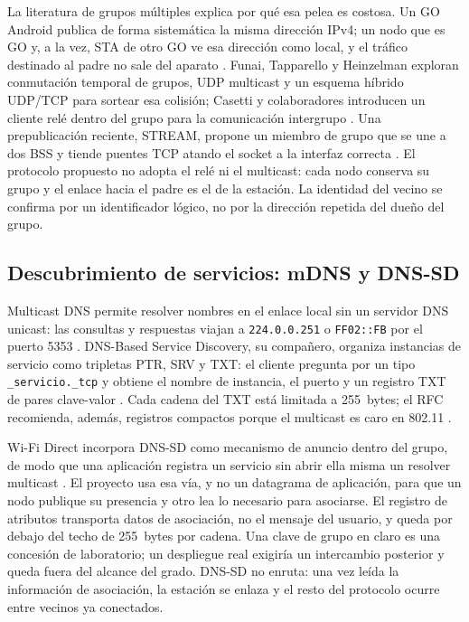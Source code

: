 \documentclass[12pt,oneside]{scrreprt}
\begin{document}
La literatura de grupos múltiples explica por qué esa pelea es costosa. Un GO Android publica de forma sistemática la misma dirección IPv4; un nodo que es GO y, a la vez, STA de otro GO ve esa dirección como local, y el tráfico destinado al padre no sale del aparato \parencite{Funai2017,Casetti2015}. Funai, Tapparello y Heinzelman exploran conmutación temporal de grupos, UDP multicast y un esquema híbrido UDP/TCP para sortear esa colisión; Casetti y colaboradores introducen un cliente relé dentro del grupo para la comunicación intergrupo \parencite{Funai2017,Casetti2015}. Una prepublicación reciente, STREAM, propone un miembro de grupo que se une a dos BSS y tiende puentes TCP atando el socket a la interfaz correcta \parencite{Dao2024}. El protocolo propuesto no adopta el relé ni el multicast: cada nodo conserva su grupo y el enlace hacia el padre es el de la estación. La identidad del vecino se confirma por un identificador lógico, no por la dirección repetida del dueño del grupo.

\subsection{Descubrimiento de servicios: mDNS y DNS-SD}
\label{sec:dns-sd}

Multicast DNS permite resolver nombres en el enlace local sin un servidor DNS unicast: las consultas y respuestas viajan a \texttt{224.0.0.251} o \texttt{FF02::FB} por el puerto 5353 \parencite{Cheshire2013mDNS}. DNS-Based Service Discovery, su compañero, organiza instancias de servicio como tripletas PTR, SRV y TXT: el cliente pregunta por un tipo \texttt{\_servicio.\_tcp} y obtiene el nombre de instancia, el puerto y un registro TXT de pares clave-valor \parencite{Cheshire2013DNSSD}. Cada cadena del TXT está limitada a 255~bytes; el RFC recomienda, además, registros compactos porque el multicast es caro en 802.11 \parencite{Cheshire2013DNSSD}.

Wi-Fi Direct incorpora DNS-SD como mecanismo de anuncio dentro del grupo, de modo que una aplicación registra un servicio sin abrir ella misma un resolver multicast \parencite{WiFiAlliance2010,AndroidDevelopersWifiP2p}. El proyecto usa esa vía, y no un datagrama de aplicación, para que un nodo publique su presencia y otro lea lo necesario para asociarse. El registro de atributos transporta datos de asociación, no el mensaje del usuario, y queda por debajo del techo de 255~bytes por cadena. Una clave de grupo en claro es una concesión de laboratorio; un despliegue real exigiría un intercambio posterior y queda fuera del alcance del grado. DNS-SD no enruta: una vez leída la información de asociación, la estación se enlaza y el resto del protocolo ocurre entre vecinos ya conectados.
\end{document}
